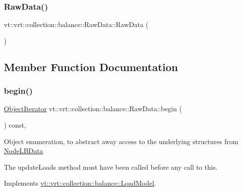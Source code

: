 \subsubsection{\texorpdfstring{Raw\+Data()}{RawData()}}
{\footnotesize\ttfamily vt\+::vrt\+::collection\+::balance\+::\+Raw\+Data\+::\+Raw\+Data (\begin{DoxyParamCaption}{ }\end{DoxyParamCaption})\hspace{0.3cm}{\ttfamily [default]}}



\subsection{Member Function Documentation}
\mbox{\label{structvt_1_1vrt_1_1collection_1_1balance_1_1_raw_data_acfe356d51313995dacf50868f3fac19b}} 
\subsubsection{\texorpdfstring{begin()}{begin()}}
{\footnotesize\ttfamily \hyperlink{structvt_1_1vrt_1_1collection_1_1balance_1_1_object_iterator}{Object\+Iterator} vt\+::vrt\+::collection\+::balance\+::\+Raw\+Data\+::begin (\begin{DoxyParamCaption}{ }\end{DoxyParamCaption}) const\hspace{0.3cm}{\ttfamily [override]}, {\ttfamily [virtual]}}

Object enumeration, to abstract away access to the underlying structures from \hyperlink{structvt_1_1vrt_1_1collection_1_1balance_1_1_node_l_b_data}{Node\+L\+B\+Data}

The {\ttfamily update\+Loads} method must have been called before any call to this. 

Implements \hyperlink{structvt_1_1vrt_1_1collection_1_1balance_1_1_load_model_a085a13e3cfeff2beb88b49ddaed4ef8d}{vt\+::vrt\+::collection\+::balance\+::\+Load\+Model}.

\mbox{\label{structvt_1_1vrt_1_1collection_1_1balance_1_1_raw_data_a94b4d28a0a5024753cc382c9d1a0632d}} 
